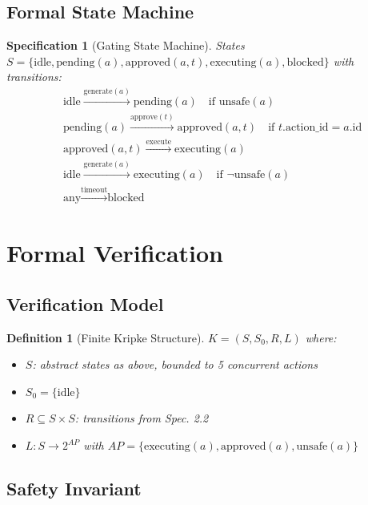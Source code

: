 \documentclass[12pt]{article}
\newtheorem{definition}{Definition}[section]
\newtheorem{spec}{Specification}[section]
\begin{document}
\subsection{Formal State Machine}

\begin{spec}[Gating State Machine]
States $S = \{\text{idle}, \text{pending}(a), \text{approved}(a,t), \text{executing}(a), \text{blocked}\}$ with transitions:
\begin{align*}
& \text{idle} \xrightarrow{\text{generate}(a)} \text{pending}(a) \quad \text{if } \text{unsafe}(a) \\
& \text{pending}(a) \xrightarrow{\text{approve}(t)} \text{approved}(a,t) \quad \text{if } t.\text{action\_id} = a.\text{id} \\
& \text{approved}(a,t) \xrightarrow{\text{execute}} \text{executing}(a) \\
& \text{idle} \xrightarrow{\text{generate}(a)} \text{executing}(a) \quad \text{if } \neg\text{unsafe}(a) \\
& \text{any} \xrightarrow{\text{timeout}} \text{blocked}
\end{align*}
\end{spec}

\section{Formal Verification}

\subsection{Verification Model}

\begin{definition}[Finite Kripke Structure]
$K = (S, S_0, R, L)$ where:
\begin{itemize}
    \item $S$: abstract states as above, bounded to 5 concurrent actions
    \item $S_0 = \{\text{idle}\}$
    \item $R \subseteq S \times S$: transitions from Spec. 2.2
    \item $L: S \to 2^{AP}$ with $AP = \{\text{executing}(a), \text{approved}(a), \text{unsafe}(a)\}$
\end{itemize}
\end{definition}

\subsection{Safety Invariant}
\end{document}
